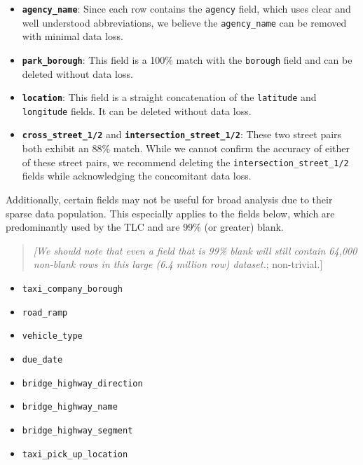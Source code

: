 \documentclass[linenumber]{jdsart}
\begin{document}
\begin{itemize}[left=1.5em]
    \item \textbf{\texttt{agency\_name}}: Since each row contains the \texttt{agency} 
    field, which uses clear and well understood abbreviations, we believe the
    \texttt{agency\_name} can be removed with minimal data loss.
    
    \item \textbf{\texttt{park\_borough}}: This field is a 100\% match with 
    the \texttt{borough} field and can be deleted without data loss.
    
    \item \textbf{\texttt{location}}: This field is a straight concatenation of 
    the \texttt{latitude} and \texttt{longitude} fields. It can be 
    deleted without data loss.
     
    \item \textbf{\texttt{cross\_street\_1/2}} and \textbf{\texttt{intersection\_street\_1/2}}: 
    These two street pairs both exhibit an 88\% match. While we cannot 
    confirm the accuracy of either of these street pairs, we recommend deleting the 
    \texttt{intersection\_street\_1/2} fields while acknowledging 
    the concomitant data loss.
\end{itemize}

Additionally, certain fields may not be useful for broad analysis
due to their sparse data population. This especially applies to the fields below, 
which are predominantly used by the TLC and are 99\% (or greater) blank.

\begin{quote}
\textit{[We should note that even a field that is 99\% 
blank will still contain 64,000 non\mbox{-}blank rows in this 
large (6.4 million row) dataset.}; non\mbox{-}trivial.]
\end{quote}

\begin{itemize}[left=1.5em]
    \item \texttt{taxi\_company\_borough}
    \item \texttt{road\_ramp}
    \item \texttt{vehicle\_type}
    \item \texttt{due\_date}
    \item \texttt{bridge\_highway\_direction}
    \item \texttt{bridge\_highway\_name}
    \item \texttt{bridge\_highway\_segment}
    \item \texttt{taxi\_pick\_up\_location}
\end{itemize}
\end{document}
